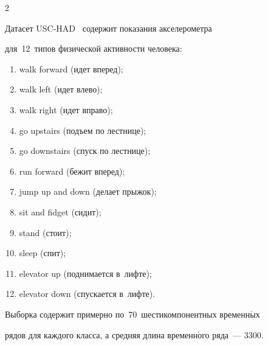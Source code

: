 \begin{multicols}{2}
\begin{figure}[b]
\label{fig:USCHAD_AR_FOURIER}


\end{figure}








Датасет USC-HAD~\cite{mi12:ubicomp-sagaware} содержит показания акселерометра 


для~12~типов физической активности человека:


\begin{enumerate}[1)]


  \item walk forward (идет вперед);


  \item walk left (идет влево);


  \item walk right (идет вправо);


  \item go upstairs (подъем по лестнице);


  \item go downstairs (спуск по лестнице);


  \item run forward (бежит вперед);


  \item jump up and down (делает прыжок);


  \item sit and fidget (сидит);


  \item stand (стоит);


  


  \pagebreak


  


  


  \item sleep (спит);


  \item elevator up (поднимается в~лифте);


  \item elevator down (спускается в~лифте).


\end{enumerate}





Выборка содержит примерно по~70~шестикомпонентных временн$\acute{\mbox{ы}}$х 


рядов для каждого класса, а средняя длина временн$\acute{\mbox{о}}$го ряда~--- 3300. 



\end{multicols}
